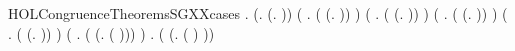 \begin{SaveVerbatim}{HOLCongruenceTheoremsSGXXcases}
\HOLTokenTurnstile{} \HOLSymConst{\HOLTokenForall{}}.
         \HOLSymConst{\HOLTokenEquiv{}}
       (\HOLSymConst{\HOLTokenExists{}}.  \HOLSymConst{=} (\HOLTokenLambda{}. )) \HOLSymConst{\HOLTokenDisj{}}
       (\HOLSymConst{\HOLTokenExists{}} . ( \HOLSymConst{=} (\HOLTokenLambda{}.   )) \HOLSymConst{\HOLTokenConj{}}  ) \HOLSymConst{\HOLTokenDisj{}}
       (\HOLSymConst{\HOLTokenExists{}} . ( \HOLSymConst{=} (\HOLTokenLambda{}.  )) \HOLSymConst{\HOLTokenConj{}}  ) \HOLSymConst{\HOLTokenDisj{}}
       (\HOLSymConst{\HOLTokenExists{}} . ( \HOLSymConst{=} (\HOLTokenLambda{}.   \HOLSymConst{\ensuremath{+}}  )) \HOLSymConst{\HOLTokenConj{}}   \HOLSymConst{\HOLTokenConj{}}  ) \HOLSymConst{\HOLTokenDisj{}}
       (\HOLSymConst{\HOLTokenExists{}} . ( \HOLSymConst{=} (\HOLTokenLambda{}.   \HOLSymConst{\ensuremath{\parallel}}  )) \HOLSymConst{\HOLTokenConj{}}   \HOLSymConst{\HOLTokenConj{}}  ) \HOLSymConst{\HOLTokenDisj{}}
       (\HOLSymConst{\HOLTokenExists{}} . ( \HOLSymConst{=} (\HOLTokenLambda{}. \HOLConst{\ensuremath{\nu}}  ( ))) \HOLSymConst{\HOLTokenConj{}}  ) \HOLSymConst{\HOLTokenDisj{}}
       \HOLSymConst{\HOLTokenExists{}} . ( \HOLSymConst{=} (\HOLTokenLambda{}.  ( ) )) \HOLSymConst{\HOLTokenConj{}}  
\end{SaveVerbatim}
